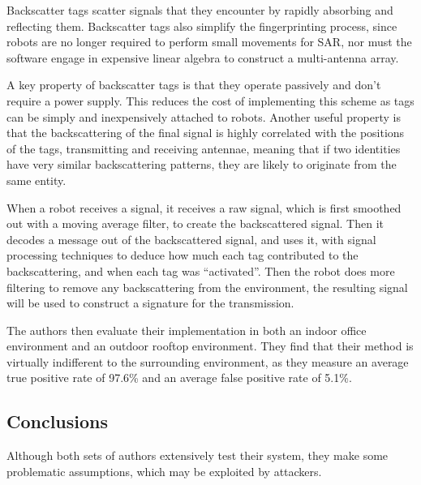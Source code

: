 Backscatter tags scatter signals that they encounter by rapidly absorbing and reflecting them. Backscatter tags also simplify the fingerprinting process, since robots are no longer required to perform small movements for SAR, nor must the software engage in expensive linear algebra to construct a multi-antenna array. 

A key property of backscatter tags is that they operate passively and don't require a power supply. This reduces the cost of implementing this scheme as tags can be simply and inexpensively attached to robots. Another useful property is that the backscattering of the final signal is highly correlated with the positions of the tags, transmitting and receiving antennae, meaning that if two identities have very similar backscattering patterns, they are likely to originate from the same entity.

When a robot receives a signal, it receives a raw signal, which is first smoothed out with a moving average filter, to create the backscattered signal. Then it decodes a message out of the backscattered signal, and uses it, with signal processing techniques to deduce how much each tag contributed to the backscattering, and when each tag was ``activated''. Then the robot does more filtering to remove any backscattering from the environment, the resulting signal will be used to construct a signature for the transmission.

The authors then evaluate their implementation in both an indoor office environment and an outdoor rooftop environment. They find that their method is virtually indifferent to the surrounding environment, as they measure an average true positive rate of 97.6\% and an average false positive rate of 5.1\%.

\subsection{Conclusions}

Although both sets of authors extensively test their system, they make some problematic assumptions, which may be exploited by attackers. 

